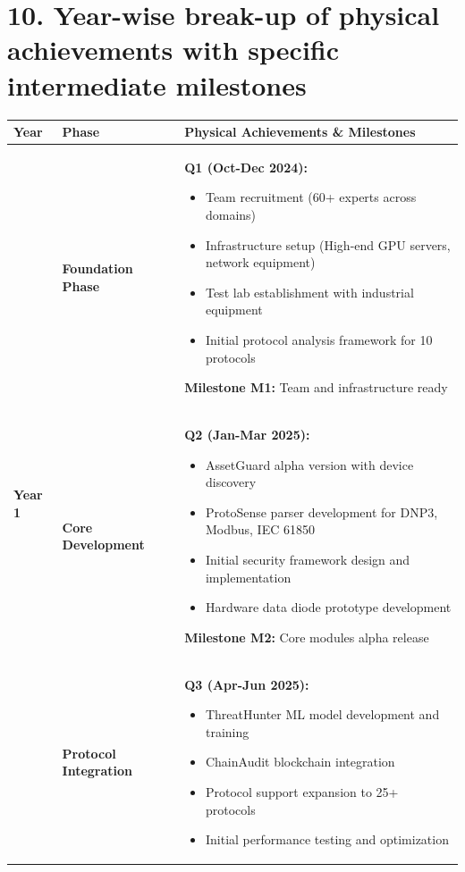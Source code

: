 \documentclass[12pt,a4paper]{article}
\begin{document}
\section*{10. Year-wise break-up of physical achievements with specific intermediate milestones}

\begin{longtable}{|p{2cm}|p{4cm}|p{8.5cm}|}
\hline
\rowcolor{lightblue}
\textbf{Year} & \textbf{Phase} & \textbf{Physical Achievements \& Milestones} \\
\hline
\endhead

\multirow{8}{*}{\textbf{Year 1}} & \textbf{Foundation Phase} & 
\textbf{Q1 (Oct-Dec 2024):}
\begin{itemize}[leftmargin=1em, itemsep=0pt]
    \item Team recruitment (60+ experts across domains)
    \item Infrastructure setup (High-end GPU servers, network equipment)
    \item Test lab establishment with industrial equipment
    \item Initial protocol analysis framework for 10 protocols
\end{itemize}

\textbf{Milestone M1:} Team and infrastructure ready \\
\cline{2-3}

& \textbf{Core Development} & 
\textbf{Q2 (Jan-Mar 2025):}
\begin{itemize}[leftmargin=1em, itemsep=0pt]
    \item AssetGuard alpha version with device discovery
    \item ProtoSense parser development for DNP3, Modbus, IEC 61850
    \item Initial security framework design and implementation
    \item Hardware data diode prototype development
\end{itemize}

\textbf{Milestone M2:} Core modules alpha release \\
\cline{2-3}

& \textbf{Protocol Integration} & 
\textbf{Q3 (Apr-Jun 2025):}
\begin{itemize}[leftmargin=1em, itemsep=0pt]
    \item ThreatHunter ML model development and training
    \item ChainAudit blockchain integration
    \item Protocol support expansion to 25+ protocols
    \item Initial performance testing and optimization
\end{itemize}


\end{longtable}
\end{document}
